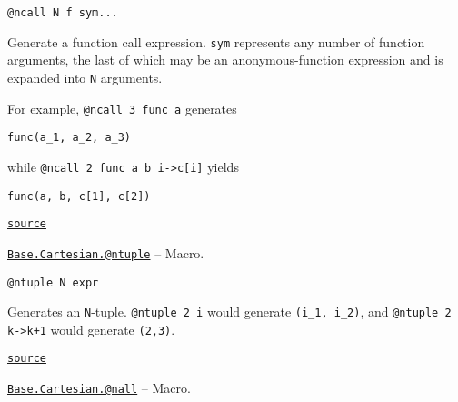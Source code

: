 \begin{adjustwidth}{2em}{0pt}


\begin{verbatim}
@ncall N f sym...
\end{verbatim}

Generate a function call expression. \texttt{sym} represents any number of function arguments, the last of which may be an anonymous-function expression and is expanded into \texttt{N} arguments.

For example, \texttt{@ncall 3 func a} generates


\begin{lstlisting}
func(a_1, a_2, a_3)
\end{lstlisting}

while \texttt{@ncall 2 func a b i->c[i]} yields


\begin{lstlisting}
func(a, b, c[1], c[2])
\end{lstlisting}



\href{https://github.com/JuliaLang/julia/blob/44fa15b1502a45eac76c9017af94332d4557b251/base/cartesian.jl#L89-L103}{\texttt{source}}


\end{adjustwidth}
\hypertarget{4425932542618492714}{} 
\hyperlink{4425932542618492714}{\texttt{Base.Cartesian.@ntuple}}  -- {Macro.}

\begin{adjustwidth}{2em}{0pt}


\begin{verbatim}
@ntuple N expr
\end{verbatim}

Generates an \texttt{N}-tuple. \texttt{@ntuple 2 i} would generate \texttt{(i\_1, i\_2)}, and \texttt{@ntuple 2 k->k+1} would generate \texttt{(2,3)}.



\href{https://github.com/JuliaLang/julia/blob/44fa15b1502a45eac76c9017af94332d4557b251/base/cartesian.jl#L193-L198}{\texttt{source}}


\end{adjustwidth}
\hypertarget{5463798602076286002}{} 
\hyperlink{5463798602076286002}{\texttt{Base.Cartesian.@nall}}  -- {Macro.}

